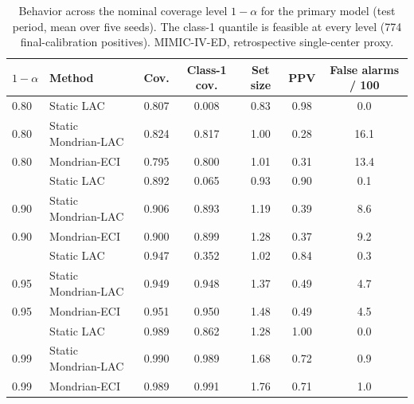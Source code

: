 \begin{table}[t]
\centering
\caption{Behavior across the nominal coverage level $1 - \alpha$ for the primary model (test period, mean over five seeds). The class-1 quantile is feasible at every level (774 final-calibration positives). MIMIC-IV-ED, retrospective single-center proxy.}
\label{tab:alpha}
\begin{tabular}{llccccc}
\toprule
$1-\alpha$ & Method & Cov. & Class-1 cov. & Set size & PPV & False alarms / 100 \\
\midrule
0.80 & Static LAC & 0.807 & 0.008 & 0.83 & 0.98 & 0.0 \\
0.80 & Static Mondrian-LAC & 0.824 & 0.817 & 1.00 & 0.28 & 16.1 \\
0.80 & Mondrian-ECI & 0.795 & 0.800 & 1.01 & 0.31 & 13.4 \\
\addlinespace
0.90 & Static LAC & 0.892 & 0.065 & 0.93 & 0.90 & 0.1 \\
0.90 & Static Mondrian-LAC & 0.906 & 0.893 & 1.19 & 0.39 & 8.6 \\
0.90 & Mondrian-ECI & 0.900 & 0.899 & 1.28 & 0.37 & 9.2 \\
\addlinespace
0.95 & Static LAC & 0.947 & 0.352 & 1.02 & 0.84 & 0.3 \\
0.95 & Static Mondrian-LAC & 0.949 & 0.948 & 1.37 & 0.49 & 4.7 \\
0.95 & Mondrian-ECI & 0.951 & 0.950 & 1.48 & 0.49 & 4.5 \\
\addlinespace
0.99 & Static LAC & 0.989 & 0.862 & 1.28 & 1.00 & 0.0 \\
0.99 & Static Mondrian-LAC & 0.990 & 0.989 & 1.68 & 0.72 & 0.9 \\
0.99 & Mondrian-ECI & 0.989 & 0.991 & 1.76 & 0.71 & 1.0 \\
\bottomrule
\end{tabular}
\end{table}
